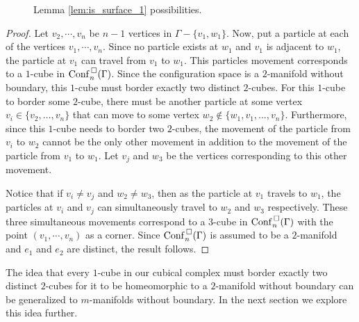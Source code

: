 \begin{lem}
\begin{figure}[h!]
\begin{enumerate*}[label=(\arabic*)]
\begin{minipage}{.3\textwidth}
            \end{minipage}
        \end{enumerate*}
    \caption{Lemma \ref{lem:is_surface_1} possibilities.}
    \label{fig:lem:is_surface_1_1}
\end{figure}
\end{lem}
\begin{proof}
    Let \(v_2, \cdots, v_n\) be \(n-1\) vertices in \(\Gamma - \{v_1, w_1\}\).   
    Now, put a particle at each of the vertices \(v_1, \cdots, v_n\).
    Since no particle exists at \(w_1\) and \(v_1\) is adjacent to \(w_1\), 
    the particle at \(v_1\) can travel from \(v_1\) to \(w_1\).
    This particles movement corresponds to a \(1\)-cube in \(\mathrm{Conf}^{\,\square}_n(\Gamma)\).
    Since the configuration space is a \(2\)-manifold without boundary, 
    this \(1\)-cube must border exactly two distinct \(2\)-cubes.
    For this \(1\)-cube to border some \(2\)-cube,
    there must be another particle at some vertex \(v_i \in \{v_2, \ldots, v_n\}\) that can move to some vertex
    \(w_2 \not \in \{w_1, v_1, \ldots, v_n\}\).
    Furthermore, since this \(1\)-cube needs to border two \(2\)-cubes, 
    the movement of the particle from \(v_i\) to \(w_2\) cannot be the only other movement in addition to
    the movement of the particle from \(v_1\) to \(w_1\). 
    Let \(v_j\) and \(w_3\) be the vertices corresponding to this other movement.
    
    Notice that if \(v_i \neq v_j\) and \(w_2 \neq w_3\), then as the particle at \(v_1\) travels to \(w_1\), the particles
    at \(v_i\) and \(v_j\) can simultaneously travel to \(w_2\) and \(w_3\) respectively. These three simultaneous movements correspond
    to a \(3\)-cube in \(\mathrm{Conf}^{\,\square}_n(\Gamma)\) with the point \((v_1, \cdots, v_n)\) as a corner.
    Since \(\mathrm{Conf}^{\,\square}_n(\Gamma)\) is assumed to be a \(2\)-manifold and \(e_1\) and \(e_2\) are distinct, 
    the result follows.
\end{proof}

The idea that every \(1\)-cube in our cubical complex must border exactly two distinct \(2\)-cubes
for it to be homeomorphic to a \(2\)-manifold without boundary can be generalized to
\(m\)-manifolds without boundary. In the next section we explore this idea further.

